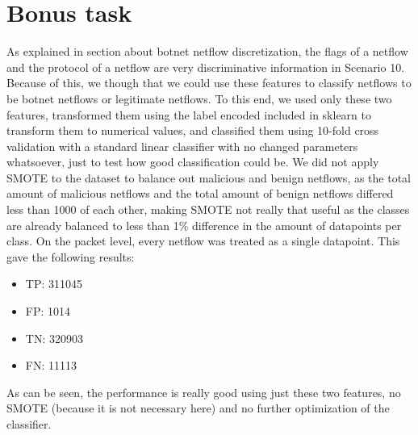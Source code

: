 \documentclass[]{article}
\begin{document}
\section{Bonus task}
As explained in section about botnet netflow discretization, the flags of a netflow and the protocol of a netflow are very discriminative information in Scenario 10. Because of this, we though that we could use these features to classify netflows to be botnet netflows or legitimate netflows. To this end, we used only these two features, transformed them using the label encoded included in sklearn to transform them to numerical values, and classified them using 10-fold cross validation with a standard linear classifier with no changed parameters whatsoever, just to test how good classification could be. We did not apply SMOTE to the dataset to balance out malicious and benign netflows, as the total amount of malicious netflows and the total amount of benign netflows differed less than 1000 of each other, making SMOTE not really that useful as the classes are already balanced to less than 1\% difference in the amount of datapoints per class. On the packet level, every netflow was treated as a single datapoint. This gave the following results:
\begin{itemize}
	\item TP: 311045
    \item FP: 1014
    \item TN: 320903
	\item FN: 11113
\end{itemize}
As can be seen, the performance is really good using just these two features, no SMOTE (because it is not necessary here) and no further optimization of the classifier.
\end{document}

